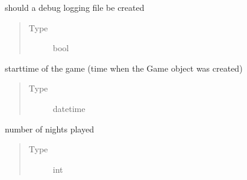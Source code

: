 \documentclass[letterpaper,10pt,english]{sphinxmanual}
\begin{document}
\begin{fulllineitems}
\begin{fulllineitems}
\end{fulllineitems}


\begin{fulllineitems}
\label{\detokenize{chatwolf:chatwolf.game.Game.do_debug}}
should a debug logging file be created
\begin{quote}\begin{description}
\item[{Type}] \leavevmode
bool

\end{description}\end{quote}

\end{fulllineitems}


\begin{fulllineitems}
\label{\detokenize{chatwolf:chatwolf.game.Game.starttime}}
starttime of the game (time when the Game object was created)
\begin{quote}\begin{description}
\item[{Type}] \leavevmode
datetime

\end{description}\end{quote}

\end{fulllineitems}


\begin{fulllineitems}
\label{\detokenize{chatwolf:chatwolf.game.Game.nn}}
number of nights played
\begin{quote}\begin{description}
\item[{Type}] \leavevmode
int

\end{description}\end{quote}

\end{fulllineitems}


\end{fulllineitems}
\end{document}
